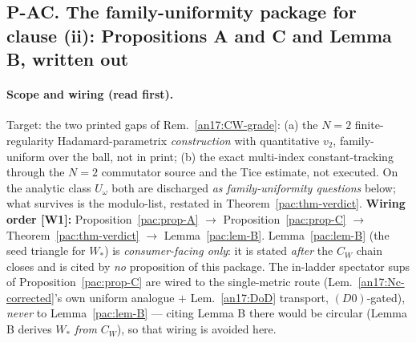 
\subsection*{P-AC. The family-uniformity package for clause (ii):
Propositions A and C and Lemma B, written out}

\paragraph{Scope and wiring (read first).} Target: the two printed gaps
of Rem.~\ref{an17:CW-grade}: \textup{(a)} the $N{=}2$
finite-regularity Hadamard-parametrix \emph{construction} with
quantitative $v_2$, family-uniform over the ball, not in print;
\textup{(b)} the exact multi-index constant-tracking through the $N{=}2$
commutator source and the Tice estimate, not executed. On the analytic
class $U_\omega$ both are discharged \emph{as family-uniformity
questions} below; what survives is the modulo-list,
restated in Theorem~\ref{pac:thm-verdict}. \textbf{Wiring order
[W1]:} Proposition~\ref{pac:prop-A} $\to$
Proposition~\ref{pac:prop-C} $\to$ Theorem~\ref{pac:thm-verdict} $\to$
Lemma~\ref{pac:lem-B}. Lemma~\ref{pac:lem-B} (the seed triangle for
$W_*$) is \emph{consumer-facing only}: it is stated \emph{after} the
$C_W$ chain closes and is cited by \emph{no} proposition of this
package. The in-ladder spectator sups of
Proposition~\ref{pac:prop-C} are wired to the single-metric route
(Lem.~\ref{an17:Nc-corrected}'s own uniform analogue $+$ Lem.~\ref{an17:DoD} transport,
$(D0)$-gated), \emph{never} to Lemma~\ref{pac:lem-B} --- citing
Lemma B there would be circular (Lemma B derives
$W_*$ \emph{from} $C_W$), so that wiring is avoided here.

